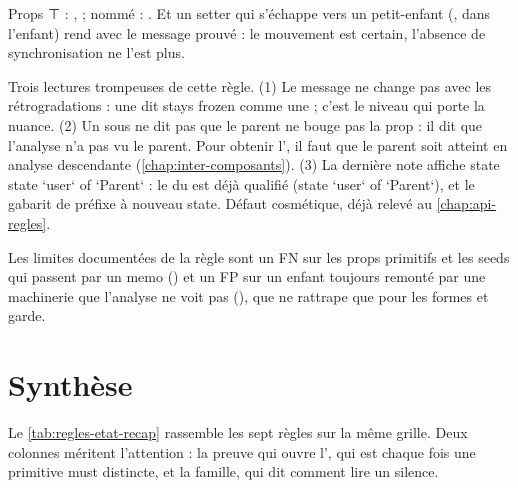 \noindent Props ⊤ : , \Warning ; nommé  : \Info. Et un setter qui s'échappe vers un petit-enfant (,  dans l'enfant) rend  avec le message \og prouvé\fg{} : le mouvement est certain, l'absence de synchronisation ne l'est plus.

\begin{piege}
Trois lectures trompeuses de cette règle. (1) Le message ne change pas avec les rétrogradations : une \Info{}  dit \og stays frozen\fg{} comme une \Error ; c'est le niveau qui porte la nuance. (2) Un \Warning{} sous  ne dit pas que le parent ne bouge pas la prop : il dit que l'analyse n'a pas vu le parent. Pour obtenir l'\Error, il faut que le parent soit atteint en analyse descendante (\cref{chap:inter-composants}). (3) La dernière note affiche \og state state `user` of `Parent`\fg{} : le  du  est déjà qualifié (\og state `user` of `Parent`\fg), et le gabarit de  préfixe à nouveau \og state\fg. Défaut cosmétique, déjà relevé au \cref{chap:api-regles}.
\end{piege}

Les limites documentées de la règle sont un FN sur les props primitifs et les seeds qui passent par un memo () et un FP sur un enfant toujours remonté par une machinerie que l'analyse ne voit pas (), que  ne rattrape que pour les formes  et garde.

\section{Synthèse}
\label{sec:regles-etat-synthese}

Le \cref{tab:regles-etat-recap} rassemble les sept règles sur la même grille. Deux colonnes méritent l'attention : la preuve qui ouvre l'\Error, qui est chaque fois une primitive must distincte, et la famille, qui dit comment lire un silence.

